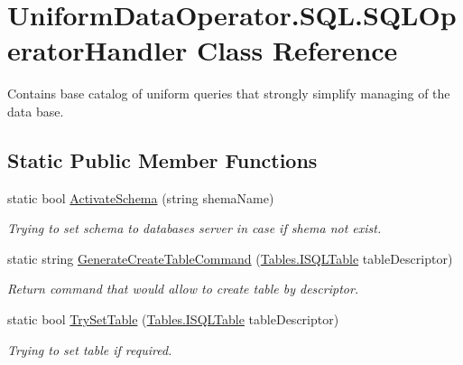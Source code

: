 \hypertarget{class_uniform_data_operator_1_1_s_q_l_1_1_s_q_l_operator_handler}{}\section{Uniform\+Data\+Operator.\+S\+Q\+L.\+S\+Q\+L\+Operator\+Handler Class Reference}
\label{class_uniform_data_operator_1_1_s_q_l_1_1_s_q_l_operator_handler}


Contains base catalog of uniform queries that strongly simplify managing of the data base.  


\subsection*{Static Public Member Functions}
\begin{DoxyCompactItemize}
\item 
static bool \mbox{\hyperlink{class_uniform_data_operator_1_1_s_q_l_1_1_s_q_l_operator_handler_a328f3133fc68bad4a27e0f91ab48a38f}{Activate\+Schema}} (string shema\+Name)
\begin{DoxyCompactList}\small\item\em Trying to set schema to databases server in case if shema not exist. \end{DoxyCompactList}\item 
static string \mbox{\hyperlink{class_uniform_data_operator_1_1_s_q_l_1_1_s_q_l_operator_handler_a4cedfb2433ea241db4b2e858d16138ea}{Generate\+Create\+Table\+Command}} (\mbox{\hyperlink{interface_uniform_data_operator_1_1_s_q_l_1_1_tables_1_1_i_s_q_l_table}{Tables.\+I\+S\+Q\+L\+Table}} table\+Descriptor)
\begin{DoxyCompactList}\small\item\em Return command that would allow to create table by descriptor. \end{DoxyCompactList}\item 
static bool \mbox{\hyperlink{class_uniform_data_operator_1_1_s_q_l_1_1_s_q_l_operator_handler_a71e288c8eb9549154c0026f9bc7e5e34}{Try\+Set\+Table}} (\mbox{\hyperlink{interface_uniform_data_operator_1_1_s_q_l_1_1_tables_1_1_i_s_q_l_table}{Tables.\+I\+S\+Q\+L\+Table}} table\+Descriptor)
\begin{DoxyCompactList}\small\item\em Trying to set table if required. \end{DoxyCompactList}\end{DoxyCompactItemize}
